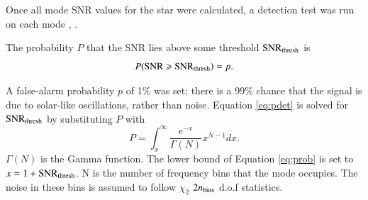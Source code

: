 \documentclass[a4paper,fleqn,usenatbib,useAMS]{mnras}
\begin{document}

Once all mode SNR values for the star were calculated, a detection test was run on each mode \citep{chaplin_predicting_2011}, \citep{campante_asteroseismic_2016}.

The probability $P$ that the SNR lies above some threshold ${\rm SNR_{thresh}}$ is
\begin{equation}
\label{eq:pdet}
{P \rm ({ SNR \geq SNR_{thresh}})} =  p .
\end{equation}

A false-alarm probability $p$ of 1\% was set; there is a 99\% chance that the signal is due to solar-like oscillations, rather than noise. Equation \ref{eq:pdet} is solved for $\rm SNR_{thresh}$ by substituting $P$ with
\begin{equation}
\label{eq:prob}
P = \int_{x}^{\infty} \frac{e^{-x}}{\Gamma(N)} x^{N-1} dx .
\end{equation}
$\Gamma(N)$ is the Gamma function. The lower bound of Equation \ref{eq:prob} is set to $x=1+{\rm SNR_{thresh}}$. N is the number of frequency bins that the mode occupies. The noise in these bins is assumed to follow $\chi_{2}$ $2n_{\rm bins}$ d.o.f statistics. 
\end{document}
